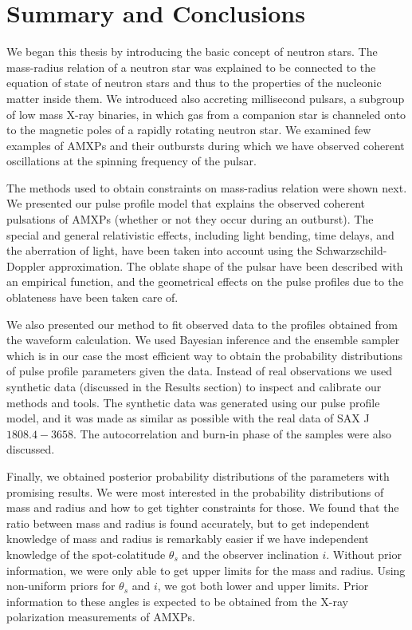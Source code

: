 \documentclass{wihuri}
\def\source{SAX J$1808.4-3658$}
\def\thetas{\theta_{s}}
\begin{document}
\clearpage


\section{Summary and Conclusions}

We began this thesis by introducing the basic concept of neutron stars. The mass-radius relation of a neutron star was explained to be connected to the equation of state of neutron stars and thus to the properties of the nucleonic matter inside them. We introduced also accreting millisecond pulsars, a subgroup of low mass X-ray binaries, in which gas from a companion star is channeled onto to the magnetic poles of a rapidly rotating neutron star. We examined few examples of AMXPs and their outbursts during which we have observed coherent oscillations at the spinning frequency of the pulsar.

The methods used to obtain constraints on mass-radius relation were shown next. We presented our pulse profile model that explains the observed coherent pulsations of AMXPs (whether or not they occur during an outburst). %
The special and general relativistic effects, including light bending, time delays, and the aberration of light, have been taken into account using the Schwarzschild-Doppler approximation. The oblate shape of the pulsar have been described with an empirical function, and the geometrical effects on the pulse profiles due to the oblateness have been taken care of. 

We also presented our method to fit observed data to the profiles obtained from the waveform calculation. We used Bayesian inference and the ensemble sampler which is in our case the most efficient way to obtain the probability distributions of pulse profile parameters given the data. Instead of real observations we used synthetic data (discussed in the Results section) to inspect and calibrate our methods and tools. The synthetic data was generated using our pulse profile model, and it was made as similar as possible with the real data of \source. The autocorrelation and burn-in phase of the samples were also discussed.

Finally, we obtained posterior probability distributions of the parameters with promising results. We were most interested in the probability distributions of mass and radius and how to get tighter constraints for those. We found that the ratio between mass and radius is found accurately, but to get independent knowledge of mass and radius is remarkably easier if we have independent knowledge of the spot-colatitude $\thetas$ and the observer inclination $i$. Without prior information, we were only able to get upper limits for the mass and radius. Using non-uniform priors for $\thetas$ and $i$, we got both lower and upper limits. Prior information to these angles is expected to be obtained from the X-ray polarization measurements of AMXPs.  
\end{document}
